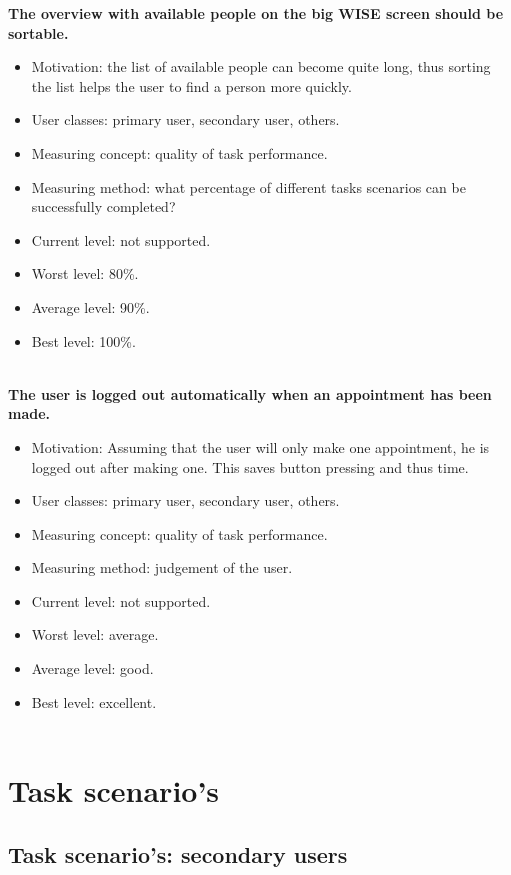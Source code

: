 \documentclass[11pt, a4paper,svglistings]{report}
\begin{document}
\textbf{The overview with available people on the big WISE screen should be sortable.}
\begin{itemize}
\item{Motivation: the list of available people can become quite long, thus sorting the list helps the user to find a person more quickly.}
\item{User classes: primary user, secondary user, others.}
\item{Measuring concept: quality of task performance.}
\item{Measuring method:  what percentage of different tasks scenarios can be successfully completed?}
\item{Current level: not supported.}
\item{Worst level: 80\%.}
\item{Average level: 90\%.}
\item{Best level: 100\%. \\ \\}
\end{itemize}
\textbf{The user is logged out automatically when an appointment has been made.}
\begin{itemize}
\item{Motivation: Assuming that the user will only make one appointment, he is logged out after making one. This saves button pressing and thus time.}
\item{User classes: primary user, secondary user, others.}
\item{Measuring concept: quality of task performance.}
\item{Measuring method: judgement of the user.}
\item{Current level: not supported.}
\item{Worst level: average.}
\item{Average level: good.}
\item{Best level: excellent. \\ \\}
\end{itemize}



\chapter{Task scenario's}

\section{Task scenario's: secondary users}
\end{document}
